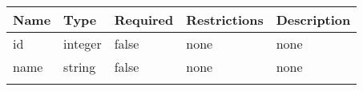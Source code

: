 \documentclass[
]{article}
\begin{document}
\begin{longtable}[]{@{}lllll@{}}
\toprule
\begin{minipage}[b]{0.17\columnwidth}\raggedright
Name\strut
\end{minipage} & \begin{minipage}[b]{0.17\columnwidth}\raggedright
Type\strut
\end{minipage} & \begin{minipage}[b]{0.17\columnwidth}\raggedright
Required\strut
\end{minipage} & \begin{minipage}[b]{0.17\columnwidth}\raggedright
Restrictions\strut
\end{minipage} & \begin{minipage}[b]{0.17\columnwidth}\raggedright
Description\strut
\end{minipage}\tabularnewline
\midrule
\endhead
\begin{minipage}[t]{0.17\columnwidth}\raggedright
id\strut
\end{minipage} & \begin{minipage}[t]{0.17\columnwidth}\raggedright
integer\strut
\end{minipage} & \begin{minipage}[t]{0.17\columnwidth}\raggedright
false\strut
\end{minipage} & \begin{minipage}[t]{0.17\columnwidth}\raggedright
none\strut
\end{minipage} & \begin{minipage}[t]{0.17\columnwidth}\raggedright
none\strut
\end{minipage}\tabularnewline
\begin{minipage}[t]{0.17\columnwidth}\raggedright
name\strut
\end{minipage} & \begin{minipage}[t]{0.17\columnwidth}\raggedright
string\strut
\end{minipage} & \begin{minipage}[t]{0.17\columnwidth}\raggedright
false\strut
\end{minipage} & \begin{minipage}[t]{0.17\columnwidth}\raggedright
none\strut
\end{minipage} & \begin{minipage}[t]{0.17\columnwidth}\raggedright
none\strut
\end{minipage}\tabularnewline
\begin{minipage}[t]{0.17\columnwidth}\raggedright

\end{minipage}
\end{longtable}
\end{document}
